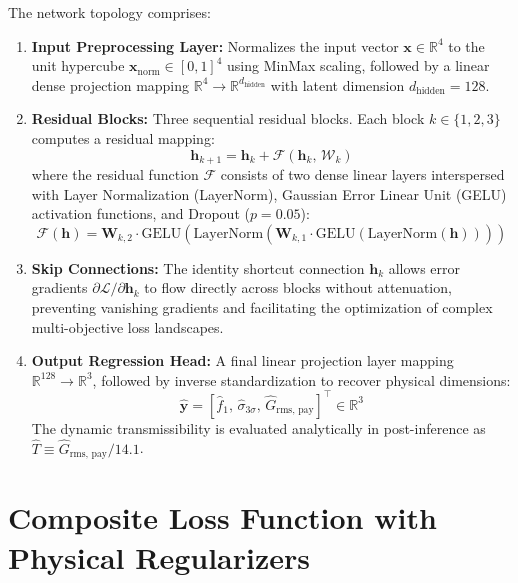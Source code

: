 \documentclass[preprint,12pt,3p]{elsarticle}
\begin{document}
The network topology comprises:
\begin{enumerate}
  \item \textbf{Input Preprocessing Layer:} Normalizes the input vector $\mathbf{x} \in \mathbb{R}^4$ to the unit hypercube $\mathbf{x}_{\text{norm}} \in [0, 1]^4$ using MinMax scaling, followed by a linear dense projection mapping $\mathbb{R}^4 \to \mathbb{R}^{d_{\text{hidden}}}$ with latent dimension $d_{\text{hidden}} = 128$.
  \item \textbf{Residual Blocks:} Three sequential residual blocks. Each block $k \in \{1, 2, 3\}$ computes a residual mapping:
    \begin{equation}
      \mathbf{h}_{k+1} = \mathbf{h}_k + \mathcal{F}\left( \mathbf{h}_k, \, \mathcal{W}_k \right)
      \label{eq:resblock}
    \end{equation}
    where the residual function $\mathcal{F}$ consists of two dense linear layers interspersed with Layer Normalization (LayerNorm), Gaussian Error Linear Unit (GELU) activation functions, and Dropout ($p = 0.05$):
    \begin{equation}
      \mathcal{F}(\mathbf{h}) = \mathbf{W}_{k,2} \cdot \text{GELU}\left( \text{LayerNorm}\left( \mathbf{W}_{k,1} \cdot \text{GELU}\left( \text{LayerNorm}(\mathbf{h}) \right) \right) \right)
    \end{equation}
  \item \textbf{Skip Connections:} The identity shortcut connection $\mathbf{h}_k$ allows error gradients $\partial \mathcal{L} / \partial \mathbf{h}_k$ to flow directly across blocks without attenuation, preventing vanishing gradients and facilitating the optimization of complex multi-objective loss landscapes.
  \item \textbf{Output Regression Head:} A final linear projection layer mapping $\mathbb{R}^{128} \to \mathbb{R}^3$, followed by inverse standardization to recover physical dimensions:
    \begin{equation}
      \hat{\mathbf{y}} = \left[ \hat{f}_1, \, \hat{\sigma}_{3\sigma}, \, \hat{G}_{\text{rms, pay}} \right]^\top \in \mathbb{R}^3
    \end{equation}
    The dynamic transmissibility is evaluated analytically in post-inference as $\hat{T} \equiv \hat{G}_{\text{rms, pay}} / 14.1$.
\end{enumerate}

\section{Composite Loss Function with Physical Regularizers}
\label{sec:loss}
\end{document}

